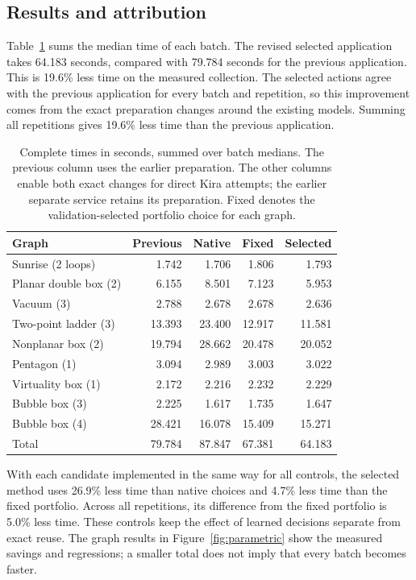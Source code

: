 \subsection{Results and attribution}
Table~\ref{tab:parametric} sums the median time of each batch. The revised selected application takes 64.183 seconds, compared with 79.784 seconds for the previous application. This is 19.6\% less time on the measured collection. The selected actions agree with the previous application for every batch and repetition, so this improvement comes from the exact preparation changes around the existing models. Summing all repetitions gives 19.6\% less time than the previous application.

\begin{table}[!htbp]\centering\small
\caption{Complete times in seconds, summed over batch medians. The previous column uses the earlier preparation. The other columns enable both exact changes for direct Kira attempts; the earlier separate service retains its preparation. Fixed denotes the validation-selected portfolio choice for each graph.}
\label{tab:parametric}
\begin{tabular}{@{}lrrrr@{}}\toprule
Graph & Previous & Native & Fixed & Selected\\\midrule
Sunrise (2 loops) & 1.742 & 1.706 & 1.806 & 1.793\\
Planar double box (2) & 6.155 & 8.501 & 7.123 & 5.953\\
Vacuum (3) & 2.788 & 2.678 & 2.678 & 2.636\\
Two-point ladder (3) & 13.393 & 23.400 & 12.917 & 11.581\\
Nonplanar box (2) & 19.794 & 28.662 & 20.478 & 20.052\\
Pentagon (1) & 3.094 & 2.989 & 3.003 & 3.022\\
Virtuality box (1) & 2.172 & 2.216 & 2.232 & 2.229\\
Bubble box (3) & 2.225 & 1.617 & 1.735 & 1.647\\
Bubble box (4) & 28.421 & 16.078 & 15.409 & 15.271\\
\midrule Total & 79.784 & 87.847 & 67.381 & 64.183\\\bottomrule
\end{tabular}\end{table}

With each candidate implemented in the same way for all controls, the selected method uses 26.9\% less time than native choices and 4.7\% less time than the fixed portfolio. Across all repetitions, its difference from the fixed portfolio is 5.0\% less time. These controls keep the effect of learned decisions separate from exact reuse. The graph results in Figure~\ref{fig:parametric} show the measured savings and regressions; a smaller total does not imply that every batch becomes faster.

